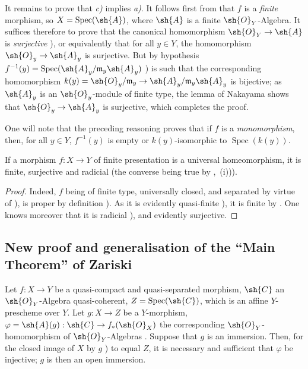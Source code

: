 
It remains to prove that \emph{c)} implies \emph{a)}.
It follows first from  that $f$ is a \emph{finite} morphism, so $X=\operatorname{Spec}(\sh{A})$, where $\sh{A}$ is a finite $\sh{O}_Y$-Algebra.
It suffices therefore to prove that the canonical homomorphism $\sh{O}_Y\to\sh{A}$ is \emph{surjective} ), or equivalently that for all $y\in Y$, the homomorphism $\sh{O}_y\to\sh{A}_y$ is surjective.
But by hypothesis $f^{-1}(y)=\operatorname{Spec}(\sh{A}_y/\mathfrak{m}_y\sh{A}_y)$ ) is such that the corresponding homomorphism $k(y)=\sh{O}_y/\mathfrak{m}_y\to\sh{A}_y/\mathfrak{m}_y\sh{A}_y$ is bijective; as $\sh{A}_y$ is an $\sh{O}_y$-module of finite type, the lemma of Nakayama shows that $\sh{O}_y\to\sh{A}_y$ is surjective, which completes the proof.

\begin{remark}[8.11.5.1]
\label{IV.8.11.5.1}
One will note that the preceding reasoning proves that if $f$ is a \emph{monomorphism}, then, for all $y\in Y$, $f^{-1}(y)$ is empty or $k(y)$-isomorphic to $\operatorname{Spec}(k(y))$.
\end{remark}

\begin{proposition}[8.11.6]
\label{IV.8.11.6}
If a morphism $f:X\to Y$ of finite presentation is a universal homeomorphism, it is finite, surjective and radicial (the converse being true by ,~(i))).
\end{proposition}

\begin{proof}
Indeed, $f$ being of finite type, universally closed, and separated by virtue of ), is proper by definition ).
As it is evidently quasi-finite ), it is finite by .
One knows moreover that it is radicial ), and evidently surjective.
\end{proof}

\subsection{New proof and generalisation of the ``Main Theorem'' of Zariski}
\label{subsection:IV.8.12}

\begin{lemma}[8.12.1]
\label{IV.8.12.1}
Let $f:X\to Y$ be a quasi-compact and quasi-separated morphism, $\sh{C}$ an $\sh{O}_Y$-Algebra quasi-coherent, $Z=\operatorname{Spec}(\sh{C})$, which is an affine $Y$-prescheme over $Y$.
Let $g:X\to Z$ be a $Y$-morphism, $\varphi=\sh{A}(g):\sh{C}\to f_*(\sh{O}_X)$ the corresponding $\sh{O}_Y$-homomorphism of $\sh{O}_Y$-Algebras .
Suppose that $g$ is an immersion.
Then, for the closed image of $X$ by $g$ ) to equal $Z$, it is necessary and sufficient that $\varphi$ be injective; $g$ is then an open immersion.
\end{lemma}

